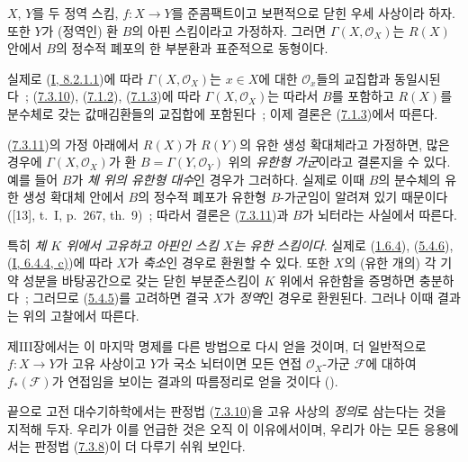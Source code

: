 \begin{corollary}[7.3.11]
\label{II.7.3.11-ko}
$X$, $Y$를 두 정역 스킴, $f:X\to Y$를 준콤팩트이고 보편적으로 닫힌
우세 사상이라 하자. 또한 $Y$가 (정역인) 환 $B$의 아핀 스킴이라고
가정하자. 그러면 $\Gamma(X,\mathcal{O}_X)$는 $R(X)$ 안에서 $B$의
정수적 폐포의 한 부분환과 표준적으로 동형이다.
\end{corollary}

실제로 (\hyperref[I.8.2.1.1-ko]{I, 8.2.1.1})에 따라
$\Gamma(X,\mathcal{O}_X)$는 $x\in X$에 대한 $\mathcal{O}_x$들의
교집합과 동일시된다~; (\hyperref[II.7.3.10-ko]{7.3.10}),
(\hyperref[II.7.1.2-ko]{7.1.2}), (\hyperref[II.7.1.3-ko]{7.1.3})에 따라
$\Gamma(X,\mathcal{O}_X)$는 따라서 $B$를 포함하고 $R(X)$를 분수체로
갖는 값매김환들의 교집합에 포함된다~; 이제 결론은
(\hyperref[II.7.1.3-ko]{7.1.3})에서 따른다.

\begin{remark}[7.3.12]
\label{II.7.3.12-ko}
(\hyperref[II.7.3.11-ko]{7.3.11})의 가정 아래에서 $R(X)$가 $R(Y)$의
유한 생성 확대체라고 가정하면, 많은 경우에 $\Gamma(X,\mathcal{O}_X)$가
환 $B=\Gamma(Y,\mathcal{O}_Y)$ 위의 \emph{유한형 가군}이라고 결론지을
수 있다. 예를 들어 $B$가 \emph{체 위의 유한형 대수}인 경우가 그러하다.
실제로 이때 $B$의 분수체의 유한 생성 확대체 안에서 $B$의 정수적 폐포가
유한형 $B$-가군임이 알려져 있기 때문이다([13], t.~I, p.~267, th.~9)~;
따라서 결론은 (\hyperref[II.7.3.11-ko]{7.3.11})과 $B$가 뇌터라는
사실에서 따른다.

특히 \emph{체 $K$ 위에서 고유하고 아핀인 스킴 $X$는 유한 스킴이다}. 실제로
(\hyperref[II.1.6.4-ko]{1.6.4}), (\hyperref[II.5.4.6-ko]{5.4.6}),
(\hyperref[I.6.4.4-ko]{I, 6.4.4, c)})에 따라 $X$가 \emph{축소}인 경우로
환원할 수 있다. 또한 $X$의 (유한 개의) 각 기약 성분을 바탕공간으로
갖는 닫힌 부분준스킴이 $K$ 위에서 유한함을 증명하면 충분하다~;
그러므로 (\hyperref[II.5.4.5-ko]{5.4.5})를 고려하면 결국 $X$가
\emph{정역}인 경우로 환원된다. 그러나 이때 결과는 위의 고찰에서
따른다.

제III장에서는 이 마지막 명제를 다른 방법으로 다시 얻을 것이며, 더
일반적으로 $f:X\to Y$가 고유 사상이고 $Y$가 국소 뇌터이면 모든 연접
$\mathcal{O}_X$-가군 $\mathcal{F}$에 대하여 $f_*(\mathcal{F})$가
연접임을 보이는 결과의 따름정리로 얻을 것이다
().

끝으로 고전 대수기하학에서는 판정법
(\hyperref[II.7.3.10-ko]{7.3.10})을 고유 사상의 \emph{정의}로 삼는다는
것을 지적해 두자. 우리가 이를 언급한 것은 오직 이 이유에서이며, 우리가
아는 모든 응용에서는 판정법 (\hyperref[II.7.3.8-ko]{7.3.8})이 더
다루기 쉬워 보인다.
\end{remark}


